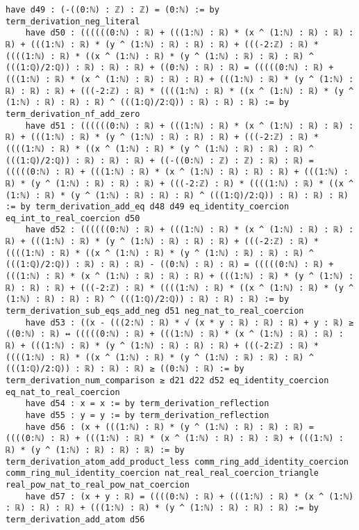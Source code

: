 \documentclass{article}
\begin{document}
\begin{tcolorbox}[colback=white!10, width=\linewidth]
\begin{lstlisting}[language=Lean4]
    have d49 : (-((0:ℕ) : ℤ) : ℤ) = (0:ℕ) := by term_derivation_neg_literal
    have d50 : ((((((0:ℕ) : ℝ) + (((1:ℕ) : ℝ) * (x ^ (1:ℕ) : ℝ) : ℝ) : ℝ) + (((1:ℕ) : ℝ) * (y ^ (1:ℕ) : ℝ) : ℝ) : ℝ) + (((-2:ℤ) : ℝ) * ((((1:ℕ) : ℝ) * ((x ^ (1:ℕ) : ℝ) * (y ^ (1:ℕ) : ℝ) : ℝ) : ℝ) ^ (((1:ℚ)/2:ℚ)) : ℝ) : ℝ) : ℝ) + ((0:ℕ) : ℝ) : ℝ) = (((((0:ℕ) : ℝ) + (((1:ℕ) : ℝ) * (x ^ (1:ℕ) : ℝ) : ℝ) : ℝ) + (((1:ℕ) : ℝ) * (y ^ (1:ℕ) : ℝ) : ℝ) : ℝ) + (((-2:ℤ) : ℝ) * ((((1:ℕ) : ℝ) * ((x ^ (1:ℕ) : ℝ) * (y ^ (1:ℕ) : ℝ) : ℝ) : ℝ) ^ (((1:ℚ)/2:ℚ)) : ℝ) : ℝ) : ℝ) := by term_derivation_nf_add_zero
    have d51 : ((((((0:ℕ) : ℝ) + (((1:ℕ) : ℝ) * (x ^ (1:ℕ) : ℝ) : ℝ) : ℝ) + (((1:ℕ) : ℝ) * (y ^ (1:ℕ) : ℝ) : ℝ) : ℝ) + (((-2:ℤ) : ℝ) * ((((1:ℕ) : ℝ) * ((x ^ (1:ℕ) : ℝ) * (y ^ (1:ℕ) : ℝ) : ℝ) : ℝ) ^ (((1:ℚ)/2:ℚ)) : ℝ) : ℝ) : ℝ) + ((-((0:ℕ) : ℤ) : ℤ) : ℝ) : ℝ) = (((((0:ℕ) : ℝ) + (((1:ℕ) : ℝ) * (x ^ (1:ℕ) : ℝ) : ℝ) : ℝ) + (((1:ℕ) : ℝ) * (y ^ (1:ℕ) : ℝ) : ℝ) : ℝ) + (((-2:ℤ) : ℝ) * ((((1:ℕ) : ℝ) * ((x ^ (1:ℕ) : ℝ) * (y ^ (1:ℕ) : ℝ) : ℝ) : ℝ) ^ (((1:ℚ)/2:ℚ)) : ℝ) : ℝ) : ℝ) := by term_derivation_add_eq d48 d49 eq_identity_coercion eq_int_to_real_coercion d50
    have d52 : ((((((0:ℕ) : ℝ) + (((1:ℕ) : ℝ) * (x ^ (1:ℕ) : ℝ) : ℝ) : ℝ) + (((1:ℕ) : ℝ) * (y ^ (1:ℕ) : ℝ) : ℝ) : ℝ) + (((-2:ℤ) : ℝ) * ((((1:ℕ) : ℝ) * ((x ^ (1:ℕ) : ℝ) * (y ^ (1:ℕ) : ℝ) : ℝ) : ℝ) ^ (((1:ℚ)/2:ℚ)) : ℝ) : ℝ) : ℝ) - ((0:ℕ) : ℝ) : ℝ) = (((((0:ℕ) : ℝ) + (((1:ℕ) : ℝ) * (x ^ (1:ℕ) : ℝ) : ℝ) : ℝ) + (((1:ℕ) : ℝ) * (y ^ (1:ℕ) : ℝ) : ℝ) : ℝ) + (((-2:ℤ) : ℝ) * ((((1:ℕ) : ℝ) * ((x ^ (1:ℕ) : ℝ) * (y ^ (1:ℕ) : ℝ) : ℝ) : ℝ) ^ (((1:ℚ)/2:ℚ)) : ℝ) : ℝ) : ℝ) := by term_derivation_sub_eqs_add_neg d51 neg_nat_to_real_coercion
    have d53 : ((x - (((2:ℕ) : ℝ) * √ (x * y : ℝ) : ℝ) : ℝ) + y : ℝ) ≥ ((0:ℕ) : ℝ) ↔ (((((0:ℕ) : ℝ) + (((1:ℕ) : ℝ) * (x ^ (1:ℕ) : ℝ) : ℝ) : ℝ) + (((1:ℕ) : ℝ) * (y ^ (1:ℕ) : ℝ) : ℝ) : ℝ) + (((-2:ℤ) : ℝ) * ((((1:ℕ) : ℝ) * ((x ^ (1:ℕ) : ℝ) * (y ^ (1:ℕ) : ℝ) : ℝ) : ℝ) ^ (((1:ℚ)/2:ℚ)) : ℝ) : ℝ) : ℝ) ≥ ((0:ℕ) : ℝ) := by term_derivation_num_comparison ≥ d21 d22 d52 eq_identity_coercion eq_nat_to_real_coercion
    have d54 : x = x := by term_derivation_reflection
    have d55 : y = y := by term_derivation_reflection
    have d56 : (x + (((1:ℕ) : ℝ) * (y ^ (1:ℕ) : ℝ) : ℝ) : ℝ) = ((((0:ℕ) : ℝ) + (((1:ℕ) : ℝ) * (x ^ (1:ℕ) : ℝ) : ℝ) : ℝ) + (((1:ℕ) : ℝ) * (y ^ (1:ℕ) : ℝ) : ℝ) : ℝ) := by term_derivation_atom_add_product_less comm_ring_add_identity_coercion comm_ring_mul_identity_coercion nat_real_real_coercion_triangle real_pow_nat_to_real_pow_nat_coercion
    have d57 : (x + y : ℝ) = ((((0:ℕ) : ℝ) + (((1:ℕ) : ℝ) * (x ^ (1:ℕ) : ℝ) : ℝ) : ℝ) + (((1:ℕ) : ℝ) * (y ^ (1:ℕ) : ℝ) : ℝ) : ℝ) := by term_derivation_add_atom d56

\end{lstlisting}
\end{tcolorbox}
\end{document}
